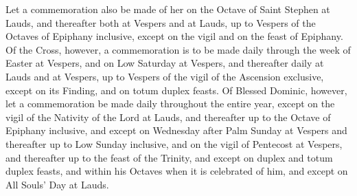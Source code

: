 \documentclass[openany]{book}
\renewcommand{\\}{\par\hspace*{.25em}} %
\begin{document}
Let a commemoration also be made of her on the Octave of Saint Stephen at Lauds, and thereafter both at Vespers and at Lauds, up to Vespers of the Octaves of Epiphany inclusive, except on the vigil and on the feast of Epiphany.
Of the Cross, however, a commemoration is to be made daily through the week of Easter at Vespers, and on Low Saturday at Vespers, and thereafter daily at Lauds and at Vespers, up to Vespers of the vigil of the Ascension exclusive, except on its Finding, and on totum duplex feasts.
Of Blessed Dominic, however, let a commemoration be made daily throughout the entire year, except on the vigil of the Nativity of the Lord at Lauds, and thereafter up to the Octave of Epiphany inclusive, and except on Wednesday after Palm Sunday at Vespers and thereafter up to Low Sunday inclusive, and on the vigil of Pentecost at Vespers, and thereafter up to the feast of the Trinity, and except on duplex and totum duplex feasts, and within his Octaves when it is celebrated of him, and except on All Souls' Day at Lauds.
\end{document}
